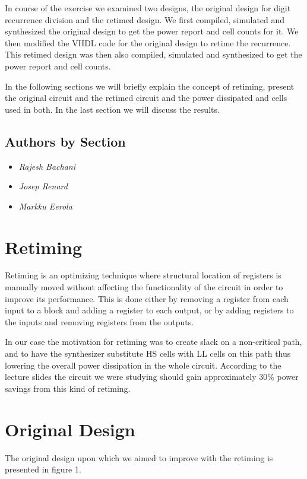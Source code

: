 \documentclass[11pt,a4paper]{article}
\begin{document}
In course of the exercise we examined two designs, the original design for digit recurrence division and the retimed design. We first compiled, simulated and synthesized the original design to get the power report and cell counts for it. We then modified the VHDL code for the original design to retime the recurrence. This retimed design was then also compiled, simulated and synthesized to get the power report and cell counts.

In the following sections we will briefly explain the concept of retiming, present the original circuit and the retimed circuit and the power dissipated and cells used in both. In the last section we will discuss the results.

\subsection{Authors by Section}
\begin{itemize}
\item \textit{Rajesh Bachani} 
\item \textit{Josep Renard} 
\item \textit{Markku Eerola} 
\end{itemize}

\section{Retiming}
Retiming is an optimizing technique where structural location of registers is manually moved without affecting the functionality of the circuit in order to improve its performance. This is done either by removing a register from each input to a block and adding a register to each output, or by adding registers to the inputs and removing registers from the outputs.

In our case the motivation for retiming was to create slack on a non-critical path, and to have the synthesizer substitute HS cells with LL cells on this path thus lowering the overall power dissipation in the whole circuit. According to the lecture slides the circuit we were studying should gain approximately 30\% power savings from this kind of retiming.

\section{Original Design}
\floatbarrier
The original design upon which we aimed to improve with the retiming is presented in figure 1.
\end{document}
